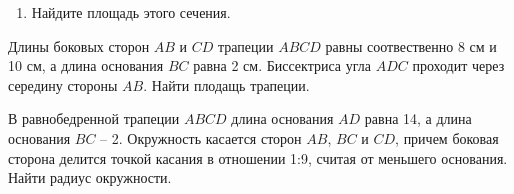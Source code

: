 \documentclass[geometry,a5paper]{pum}
\begin{document}
\begin{exercises}
\begin{question}
\begin{enumerate}[nosep,label=\asbuk*), ref=\asbuk*]
    \item Найдите площадь этого сечения.
  \end{enumerate}
\end{question}
  \begin{question}
    Длины боковых сторон $AB$ и $CD$ трапеции $ABCD$ равны соотвественно 8 см и 10 см, а длина основания $BC$ равна 2 см. Биссектриса угла $ADC$ проходит через середину стороны $AB$. Найти плодащь трапеции.
  \end{question}
  \begin{question}
    В равнобедренной трапеции $ABCD$ длина основания $AD$ равна 14, а длина основания $BC$ -- 2. Окружность касается сторон $AB$, $BC$ и $CD$, причем боковая сторона делится точкой касания в отношении 1:9, считая от меньшего основания. Найти радиус окружности.

  \end{question}
\end{exercises}
\end{document}
